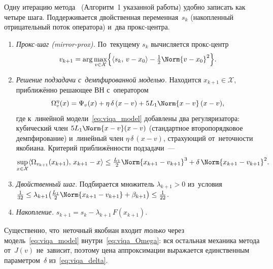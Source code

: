 Одну итерацию метода~\cite{viqa2024} (Алгоритм~1 указанной работы) удобно
записать как четыре шага. Поддерживается двойственная переменная~$s_k$
(накопленный отрицательный поток оператора) и~два прокс-центра.
\begin{enumerate}[leftmargin=*]
  \item \emph{Прокс-шаг (mirror-prox).} По~текущему $s_k$ вычисляется
        прокс-центр
        \[
          v_{k+1}
          = \arg\max_{v\in\mathcal{X}}
            \Bigl\{\langle s_k,\,v-x_0\rangle - \tfrac12\Norm{v-x_0}^2\Bigr\}.
        \]
  \item \emph{Решение подзадачи с~демпфированной моделью.} Находится
        $x_{k+1}\in\mathcal{X}$, приближённо решающее ВН с~оператором
        \begin{equation}\label{eq:viqa_Omega}
          \Omega^{\eta}_{v}(x)
          = \Psi_v(x) + \eta\,\delta\,(x-v) + 5L_1\Norm{x-v}\,(x-v),
        \end{equation}
        где к~линейной модели~\eqref{eq:viqa_model} добавлены два
        регуляризатора: кубический член $5L_1\Norm{x-v}(x-v)$
        (стандартное второпорядковое демпфирование) и~линейный член
        $\eta\,\delta\,(x-v)$, страхующий от~неточности якобиана. Критерий
        приближённости подзадачи~---
        \begin{equation}\label{eq:viqa_subcrit}
          \sup_{x\in\mathcal{X}}
            \langle\Omega_{v_{k+1}}(x_{k+1}),\,x_{k+1}-x\rangle
          \le \tfrac{L_1}{2}\Norm{x_{k+1}-v_{k+1}}^3
              + \delta\,\Norm{x_{k+1}-v_{k+1}}^2 .
        \end{equation}
  \item \emph{Двойственный шаг.} Подбирается множитель $\lambda_{k+1}>0$
        из~условия
        $\tfrac{1}{32}\le\lambda_{k+1}\bigl(\tfrac{L_1}{2}\Norm{x_{k+1}-v_{k+1}}
        +\beta_{k+1}\bigr)\le\tfrac{1}{22}$.
  \item \emph{Накопление.} $s_{k+1} = s_k - \lambda_{k+1}\,F(x_{k+1})$.
\end{enumerate}
Существенно, что~неточный якобиан входит \emph{только} через
модель~\eqref{eq:viqa_model} внутри~\eqref{eq:viqa_Omega}: вся остальная
механика метода от~$J(v)$ не~зависит, поэтому цена аппроксимации
выражается единственным параметром~$\delta$
из~\eqref{eq:viqa_delta}.

